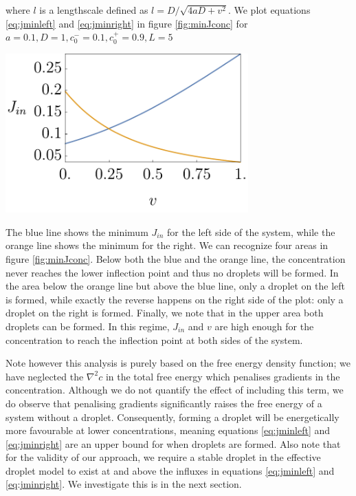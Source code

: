 \documentclass{Dissertate}
\let\origfigure\figure
\let\endorigfigure\endfigure
\renewenvironment{figure}[1][2] {
    \expandafter\origfigure\expandafter[H]
} {
    \endorigfigure
}
\begin{document}
where \(l\) is a lengthscale defined as \(l=D/\sqrt{4aD+v^2}\). We plot equations \ref{eq:jminleft} and \ref{eq:jminright} in figure \ref{fig:minJconc} for \(a=0.1, D=1 ,c_0^-=0.1,c_0^+=0.9, L=5\)

\begin{figure}
\hypertarget{fig:minJconc}{%
\centering
\includegraphics[width=0.7\textwidth]{source/figures/pdf/Jmin.pdf}
\caption{The minimum required influx for a given advection speed to form a droplet on the left (blue line) and right (orange line). Plotting parameters are \(a=0.1, D=1 ,c_0^-=0.1,c_0^+=0.9, L=5\).}\label{fig:minJconc}
}
\end{figure}

The blue line shows the minimum \(J_{in}\) for the left side of the
system, while the orange line shows the minimum for the right. We can
recognize four areas in figure \ref{fig:minJconc}. Below both the
blue and the orange line, the concentration never reaches the lower
inflection point and thus no droplets will be formed. In the area below
the orange line but above the blue line, only a droplet on the left is
formed, while exactly the reverse happens on the right side of the plot:
only a droplet on the right is formed. Finally, we note that in the
upper area both droplets can be formed. In this regime, \(J_{in}\) and
\(v\) are high enough for the concentration to reach the inflection
point at both sides of the system.

Note however this analysis is purely based on the free energy density function; we have neglected the $\nabla^2 c$ in the total free energy which penalises gradients in the concentration. Although we do not quantify the effect of including this term, we do observe that penalising gradients significantly raises the free energy of a system without a droplet. Consequently, forming a droplet will be energetically more favourable at lower concentrations, meaning equations \ref{eq:jminleft} and \ref{eq:jminright} are an upper bound for when droplets are formed. Also note that for the validity of our approach, we require a stable droplet in the effective droplet model to exist at and above the influxes in equations \ref{eq:jminleft} and \ref{eq:jminright}. We investigate this is in the next section.
\end{document}

